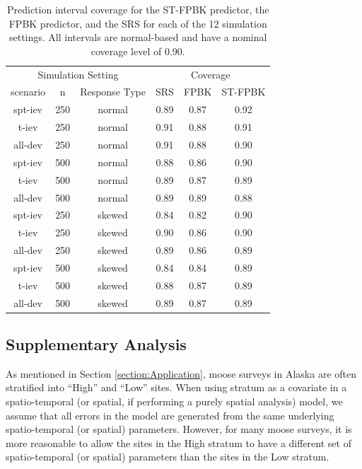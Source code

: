 \documentclass[]{article}    %
\begin{document}
\begin{table}[H]

\caption{\label{tab:simpitab}Prediction interval coverage for the ST-FPBK predictor, the FPBK predictor, and the SRS for each of the 12 simulation settings. All intervals are normal-based and have a nominal coverage level of 0.90.}
\centering
\begin{tabular}[t]{cccccc}
\toprule
\multicolumn{3}{c}{Simulation Setting} & \multicolumn{3}{c}{Coverage} \\
\cmidrule(l{3pt}r{3pt}){1-3} \cmidrule(l{3pt}r{3pt}){4-6}
scenario & n & Response Type & SRS & FPBK & ST-FPBK\\
\midrule
spt-iev & 250 & normal & 0.89 & 0.87 & 0.92\\
t-iev & 250 & normal & 0.91 & 0.88 & 0.91\\
all-dev & 250 & normal & 0.91 & 0.88 & 0.90\\
\midrule
spt-iev & 500 & normal & 0.88 & 0.86 & 0.90\\
t-iev & 500 & normal & 0.89 & 0.87 & 0.89\\
all-dev & 500 & normal & 0.89 & 0.89 & 0.88\\
\midrule
spt-iev & 250 & skewed & 0.84 & 0.82 & 0.90\\
t-iev & 250 & skewed & 0.90 & 0.86 & 0.90\\
all-dev & 250 & skewed & 0.89 & 0.86 & 0.89\\
\midrule
spt-iev & 500 & skewed & 0.84 & 0.84 & 0.89\\
t-iev & 500 & skewed & 0.88 & 0.87 & 0.89\\
all-dev & 500 & skewed & 0.89 & 0.87 & 0.89\\
\bottomrule
\end{tabular}
\end{table}

\subsection{Supplementary Analysis}

As mentioned in Section \ref{section:Application}, moose surveys in
Alaska are often stratified into ``High'' and ``Low'' sites. When using
stratum as a covariate in a spatio-temporal (or spatial, if performing a
purely spatial analysis) model, we assume that all errors in the model
are generated from the same underlying spatio-temporal (or spatial)
parameters. However, for many moose surveys, it is more reasonable to
allow the sites in the High stratum to have a different set of
spatio-temporal (or spatial) parameters than the sites in the Low
stratum.
\end{document}

